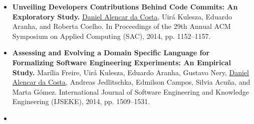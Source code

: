 \begin{sloppypar}
\begin{itemize}
\item \textbf{Unveiling Developers Contributions Behind Code Commits: An
	Exploratory Study.} \underline{Daniel Alencar da Costa}, Uir\'{a} Kulesza, Eduardo Aranha,
	and Roberta Coelho. In Proceedings of the 29th Annual ACM Symposium on Applied
	Computing (SAC), 2014, pp. 1152--1157.

\item \textbf{Assessing and Evolving a Domain Specific Language for Formalizing Software
	Engineering Experiments: An Empirical Study.} Mar\'{i}lia Freire, Uir\'{a}
	Kulesza, Eduardo Aranha, Gustavo Nery, \underline{Daniel Alencar da Costa},
	Andreas Jedlitschka, Edmilson Campos, Silvia Acu\~{n}a, and Marta G\'{o}mez.
	International Journal of Software Engineering and Knowledge Engineering
	(IJSEKE), 2014, pp. 1509--1531.

\item 

\end{itemize}

\end{sloppypar}
\newpage

